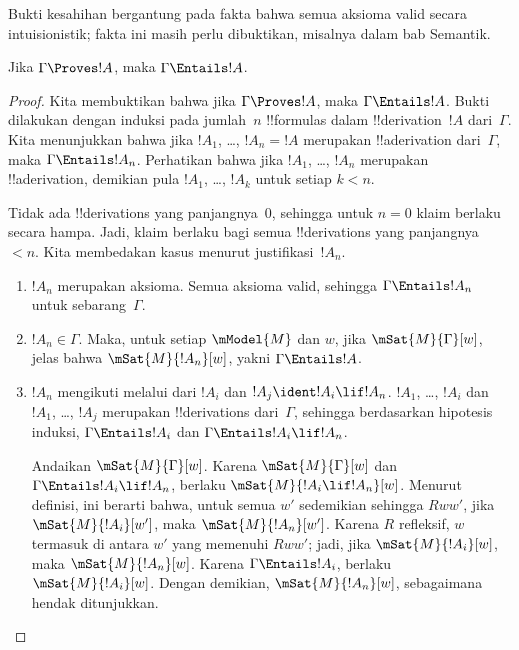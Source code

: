 \documentclass[../../../include/open-logic-section]{subfiles}
\begin{document}


\begin{editorial}
  Bukti kesahihan bergantung pada fakta bahwa semua aksioma valid secara
  intuisionistik; fakta ini masih perlu dibuktikan, misalnya dalam bab
  Semantik.
\end{editorial}

\begin{thm}[Kesahihan]
  Jika $\Gamma\Proves !A$, maka $\Gamma\Entails !A$.
\end{thm}

\begin{proof}
  Kita membuktikan bahwa jika $\Gamma\Proves !A$, maka
  $\Gamma\Entails !A$. Bukti dilakukan dengan induksi pada jumlah~$n$
  !!{formula}s dalam !!{derivation}~$!A$ dari~$\Gamma$. Kita menunjukkan
  bahwa jika $!A_1$, \dots, $!A_n=!A$ merupakan !!a{derivation}
  dari~$\Gamma$, maka $\Gamma\Entails !A_n$. Perhatikan bahwa jika $!A_1$,
  \dots, $!A_n$ merupakan !!a{derivation}, demikian pula $!A_1$, \dots,
  $!A_k$ untuk setiap $k<n$.

  Tidak ada !!{derivation}s yang panjangnya~$0$, sehingga untuk $n=0$ klaim
  berlaku secara hampa. Jadi, klaim berlaku bagi semua !!{derivation}s yang
  panjangnya~$<n$. Kita membedakan kasus menurut justifikasi~$!A_n$.

  \begin{enumerate}
  \item $!A_n$ merupakan aksioma. Semua aksioma valid, sehingga
    $\Gamma\Entails !A_n$ untuk sebarang~$\Gamma$.
  \item $!A_n\in\Gamma$. Maka, untuk setiap $\mModel{M}$ dan $w$, jika
    $\mSat{M}{\Gamma}[w]$, jelas bahwa $\mSat{M}{!A_n}[w]$, yakni
    $\Gamma\Entails !A$.
  \item $!A_n$ mengikuti melalui \MP{} dari $!A_i$ dan
    $!A_j\ident !A_i\lif !A_n$. $!A_1$, \dots, $!A_i$ dan $!A_1$, \dots,
    $!A_j$ merupakan !!{derivation}s dari~$\Gamma$, sehingga berdasarkan
    hipotesis induksi, $\Gamma\Entails !A_i$ dan
    $\Gamma\Entails !A_i\lif !A_n$.

    Andaikan $\mSat{M}{\Gamma}[w]$. Karena $\mSat{M}{\Gamma}[w]$ dan
    $\Gamma\Entails !A_i\lif !A_n$, berlaku
    $\mSat{M}{!A_i\lif !A_n}[w]$. Menurut definisi, ini berarti bahwa, untuk
    semua $w'$ sedemikian sehingga $Rww'$, jika $\mSat{M}{!A_i}[w']$, maka
    $\mSat{M}{!A_n}[w']$. Karena $R$ refleksif, $w$ termasuk di antara $w'$
    yang memenuhi $Rww'$; jadi, jika $\mSat{M}{!A_i}[w]$, maka
    $\mSat{M}{!A_n}[w]$. Karena $\Gamma\Entails !A_i$, berlaku
    $\mSat{M}{!A_i}[w]$. Dengan demikian, $\mSat{M}{!A_n}[w]$, sebagaimana
    hendak ditunjukkan.
  \end{enumerate}
\end{proof}
\end{document}
